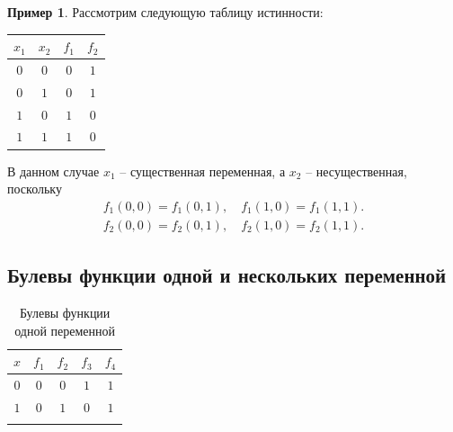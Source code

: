 \documentclass[a5paper, 11pt]{extarticle}
\theoremstyle{definition}
\newtheorem*{example*}{Пример}
\theoremstyle{definition}
\theoremstyle{definition}
\numberwithin{figure}{section}
\numberwithin{table}{section}
\begin{document}
\begin{example*}
    Рассмотрим следующую таблицу истинности:

    \vspace*{1em}

    {
        \renewcommand*{\arraystretch}{1.5}
        \begin{longtable}{|c|c|c|c|}
            \hline
            \(x_1\) & \(x_2\) & \(f_1\) & \(f_2\) \\
            \hline
            \(0\)   & \(0\)   & \(0\)   & \(1\)   \\
            \hline
            \(0\)   & \(1\)   & \(0\)   & \(1\)   \\
            \hline
            \(1\)   & \(0\)   & \(1\)   & \(0\)   \\
            \hline
            \(1\)   & \(1\)   & \(1\)   & \(0\)   \\
            \hline
        \end{longtable}
    }

    В данном случае \(x_1\) -- существенная переменная, а \(x_2\) -- несущественная, поскольку
    \begin{gather*}
        f_1(0, 0) = f_1(0, 1),
        \quad
        f_1(1, 0) = f_1(1, 1).
        \\
        f_2(0, 0) = f_2(0, 1),
        \quad
        f_2(1, 0) = f_2(1, 1).
    \end{gather*}
\end{example*}

\subsection{Булевы функции одной и нескольких переменной}

{
    \renewcommand*{\arraystretch}{1.5}
    \begin{longtable}{|c|c|c|c|c|}
        \hline
        \(x\) & \(f_1\) & \(f_2\) & \(f_3\) & \(f_4\) \\
        \hline
        \(0\) & \(0\)   & \(0\)   & \(1\)   & \(1\)   \\
        \hline
        \(1\) & \(0\)   & \(1\)   & \(0\)   & \(1\)   \\
        \hline
        \caption{Булевы функции одной переменной}
    \end{longtable}
}
\end{document}
